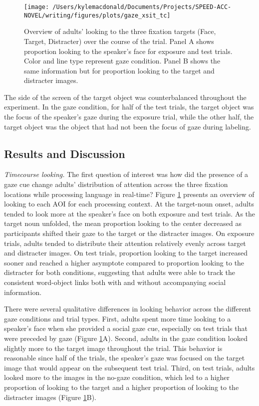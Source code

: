 \documentclass[man,floatsintext]{apa6}
\begin{document}
\begin{figure}[!t]

{\centering \texttt{[image: /Users/kylemacdonald/Documents/Projects/SPEED-ACC-NOVEL/writing/figures/plots/gaze\_xsit\_tc]} 

}

\caption{Overview of adults' looking to the three fixation targets (Face, Target, Distracter) over the course of the trial. Panel A shows proportion looking to the speaker's face for exposure and test trials. Color and line type represent gaze condition. Panel B shows the same information but for proportion looking to the target and distracter images.}\label{fig:gaze-xsit-tc-plot}
\end{figure}

The side of the screen of the target object was counterbalanced
throughout the experiment. In the gaze condition, for half of the test
trials, the target object was the focus of the speaker's gaze during the
exposure trial, while the other half, the target object was the object
that had not been the focus of gaze during labeling.

\subsection{Results and Discussion}\label{results-and-discussion-1}

\emph{Timecourse looking.} The first question of interest was how did
the presence of a gaze cue change adults' distribution of attention
across the three fixation locations while processing language in
real-time? Figure \ref{fig:gaze-xsit-tc-plot} presents an overview of
looking to each AOI for each processing context. At the target-noun
onset, adults tended to look more at the speaker's face on both exposure
and test trials. As the target noun unfolded, the mean proportion
looking to the center decreased as participants shifted their gaze to
the target or the distracter images. On exposure trials, adults tended
to distribute their attention relatively evenly across target and
distracter images. On test trials, proportion looking to the target
increased sooner and reached a higher asymptote compared to proportion
looking to the distracter for both conditions, suggesting that adults
were able to track the consistent word-object links both with and
without accompanying social information.

There were several qualitative differences in looking behavior across
the different gaze conditions and trial types. First, adults spent more
time looking to a speaker's face when she provided a social gaze cue,
especially on test trials that were preceded by gaze (Figure
\ref{fig:gaze-xsit-tc-plot}A). Second, adults in the gaze condition
looked slightly more to the target image throughout the trial. This
behavior is reasonable since half of the trials, the speaker's gaze was
focused on the target image that would appear on the subsequent test
trial. Third, on test trials, adults looked more to the images in the
no-gaze condition, which led to a higher proportion of looking to the
target and a higher proportion of looking to the distracter images
(Figure \ref{fig:gaze-xsit-tc-plot}B).
\end{document}
